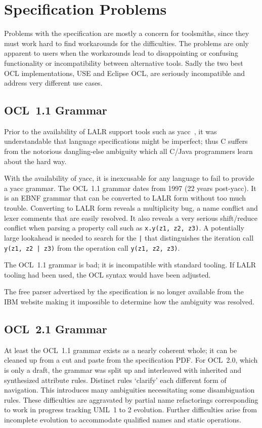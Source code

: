 \documentclass{jot}
\begin{document}
\section{Specification Problems}\label{Specification Problems}

Problems with the specification are mostly a concern for toolsmiths, since they must work hard to find workarounds for the difficulties. The problems are only apparent to users when the workarounds lead to disappointing or confusing functionality or incompatibility between alternative tools. Sadly the two best OCL implementations, USE and Eclipse OCL, are seriously incompatible and address very different use cases. 

\subsection{OCL~1.1 Grammar}

Prior to the availability of LALR support tools such as yacc~\cite{YACC}, it was understandable that language specifications might be imperfect; thus C suffers from the notorious dangling-else ambiguity which all C/Java programmers learn about the hard way.

With the availability of yacc, it is inexcusable for any language to fail to provide a yacc grammar. The OCL~1.1 grammar dates from 1997 (22 years post-yacc). It is an EBNF grammar that can be converted to LALR form without too much trouble. Converting to LALR form reveals a multiplicity bug, a name conflict and lexer comments that are easily resolved. It also reveals a very serious shift/reduce conflict when parsing a property call such as \verb$x.y(z1, z2, z3)$. A potentially large lookahead is needed to search for the \verb$|$ that distinguishes the iteration call \verb$y(z1, z2 | z3)$ from the operation call \verb$y(z1, z2, z3)$. 

The OCL~1.1 grammar is bad; it is incompatible with standard tooling. If LALR tooling had been used, the OCL syntax would have been adjusted.

The free parser advertised by the specification is no longer available from the IBM website making it impossible to determine how the ambiguity was resolved.

\subsection{OCL~2.1 Grammar}

At least the OCL~1.1 grammar exists as a nearly coherent whole; it can be cleaned up from a cut and paste from the specification PDF. For OCL~2.0, which is only a draft, the grammar was split up and interleaved with inherited and synthesized attribute rules. Distinct rules `clarify' each different form of navigation. This introduces many ambiguities necessitating some disambiguation rules. These difficulties are aggravated by partial name refactorings corresponding to work in progress tracking UML~1 to 2 evolution. Further difficulties arise from incomplete evolution to accommodate qualified names and static operations.
\end{document}
